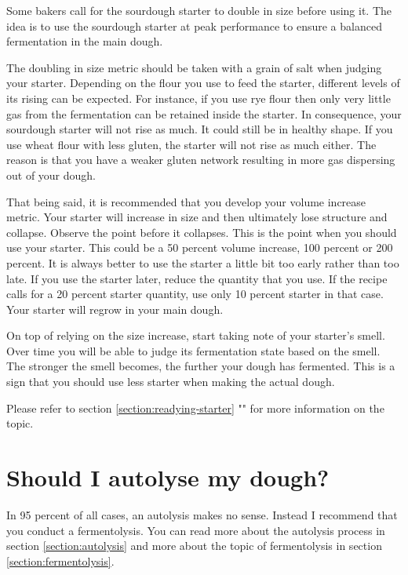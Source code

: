 Some bakers call for the sourdough starter to
double in size before using it.
The idea is to use the sourdough starter at
peak performance to ensure a
balanced fermentation in the main dough.

The doubling in size metric should be
taken with a grain of salt when judging
your starter. Depending on the flour
you use to feed the starter, different levels
of its rising can be expected.
For instance, if you use rye flour then only
very little gas from the
fermentation can be retained inside the
starter. In consequence, your
sourdough starter will not rise as much. It
could still be in healthy shape. If you use wheat flour with less gluten,
the starter will not rise as
much either. The reason is that you have a weaker
gluten network resulting in
more gas dispersing out of your dough.

That being said, it is recommended that you develop
your volume increase
metric. Your starter will increase in size and then
ultimately lose structure
and collapse. Observe the point before it collapses.
This is the point when
you should use your starter. This could be a
50 percent volume increase, 100
percent or 200 percent. It is always better to use
the starter a little bit
too early rather than too late. If you use the
starter later, reduce the
quantity that you use. If the recipe calls for a 20
percent starter quantity,
use only 10
percent starter in that case. Your starter will
regrow in your main dough.

On top of relying on the size increase, start
taking note of your starter's
smell. Over time you will be able to judge its
fermentation state based on the
smell. The stronger the smell becomes, the further
your dough has fermented.
This is a sign that you should use less starter
when making the actual dough.

Please refer to section \ref{section:readying-starter} ""
for more information on the topic.

\section{Should I autolyse my dough?}

In 95 percent of all cases, an autolysis
makes no sense. Instead I recommend
that you conduct a fermentolysis. You
can read more about the autolysis process in
section \ref{section:autolysis} and
more about the topic of fermentolysis
in section \ref{section:fermentolysis}.

